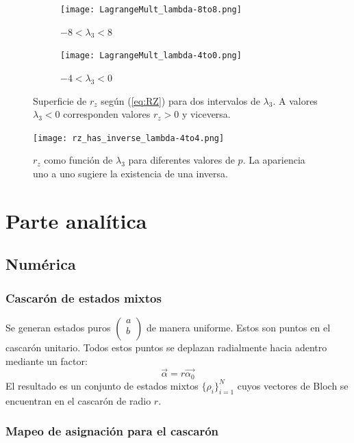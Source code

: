 \documentclass[onecolumn,11pt]{article}
\begin{document}
\begin{figure}[h!]
\centering
\begin{subfigure}{0.475\textwidth}
  \centering
  \texttt{[image: LagrangeMult\_lambda-8to8.png]}
  \caption{$-8<\lambda_{3}<8$}
\end{subfigure}%
\begin{subfigure}{0.475\textwidth}
  \centering
  \texttt{[image: LagrangeMult\_lambda-4to0.png]}
  \caption{$-4<\lambda_{3}<0$}
\end{subfigure}
\caption{Superficie de $r_{z}$ según (\ref{eq:RZ}) para dos intervalos de $\lambda_{3}$. A valores $\lambda_{3}<0$ corresponden valores $r_{z}>0$ y viceversa.}
\label{fig:rzsurf}
\end{figure}
\begin{figure}[h!]
\centering
\texttt{[image: rz\_has\_inverse\_lambda-4to4.png]}
\caption{$r_{z}$ como función de $\lambda_{3}$ para diferentes valores de $p$. La apariencia uno a uno sugiere la existencia de una inversa.}
\label{fig:rzinv}
\end{figure}

\section{Parte analítica}

\subsection{Numérica}
\subsubsection{Cascarón de estados mixtos}
Se generan estados puros $\begin{pmatrix}
a\\
b\\ \end{pmatrix}$ de manera uniforme. Estos son puntos en el cascarón unitario. Todos estos puntos se deplazan radialmente hacia adentro mediante un factor:
\begin{equation}
\vec{\alpha}=r\vec{\alpha_{0}}
\end{equation}
El resultado es un conjunto de estados mixtos $\{\rho_{i}\}_{i=1}^{N}$ cuyos vectores de Bloch se encuentran en el cascarón de radio $r$.

\subsubsection{Mapeo de asignación para el cascarón}
\end{document}
